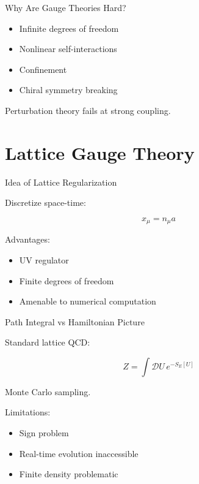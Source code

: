 \documentclass[11pt]{beamer}
\begin{document}
\begin{frame}{Why Are Gauge Theories Hard?}

\begin{itemize}
\item Infinite degrees of freedom
\item Nonlinear self-interactions
\item Confinement
\item Chiral symmetry breaking
\end{itemize}

Perturbation theory fails at strong coupling.
\end{frame}

\section{Lattice Gauge Theory}

\begin{frame}{Idea of Lattice Regularization}

Discretize space-time:

\[
x_\mu = n_\mu a
\]

Advantages:
\begin{itemize}
\item UV regulator
\item Finite degrees of freedom
\item Amenable to numerical computation
\end{itemize}
\end{frame}

\begin{frame}{Path Integral vs Hamiltonian Picture}

Standard lattice QCD:

\[
Z = \int \mathcal{D}U\, e^{-S_E[U]}
\]

Monte Carlo sampling.

Limitations:
\begin{itemize}
\item Sign problem
\item Real-time evolution inaccessible
\item Finite density problematic
\end{itemize}
\end{frame}
\end{document}
